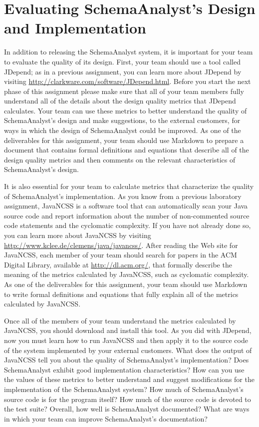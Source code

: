 \section*{Evaluating SchemaAnalyst's Design and Implementation}

In addition to releasing the SchemaAnalyst system, it is important for your team to evaluate the quality of its design.
First, your team should use a tool called JDepend; as in a previous assignment, you can learn more about JDepend by
visiting \url{http://clarkware.com/software/JDepend.html}.  Before you start the next phase of this assignment please
make sure that all of your team members fully understand all of the details about the design quality metrics that
JDepend calculates.  Your team can use these metrics to better understand the quality of SchemaAnalyst's design and
make suggestions, to the external customers, for ways in which the design of SchemaAnalyst could be improved. As one of
the deliverables for this assignment, your team should use Markdown to prepare a document that contains formal
definitions and equations that describe all of the design quality metrics and then comments on the relevant
characteristics of SchemaAnalyst's design.

It is also essential for your team to calculate metrics that characterize the quality of SchemaAnalyst's implementation.
As you know from a previous laboratory assignment, JavaNCSS is a software tool that can automatically scan your Java
source code and report information about the number of non-commented source code statements and the cyclomatic
complexity.  If you have not already done so, you can learn more about JavaNCSS by visiting
\url{http://www.kclee.de/clemens/java/javancss/}. After reading the Web site for JavaNCSS, each member of your team
should search for papers in the ACM Digital Library, available at \url{http://dl.acm.org/}, that formally describe the
meaning of the metrics calculated by JavaNCSS, such as cyclomatic complexity. As one of the deliverables for this
assignment, your team should use Markdown to write formal definitions and equations that fully explain all of the
metrics calculated by JavaNCSS.

Once all of the members of your team understand the metrics calculated by JavaNCSS, you should download and install this
tool.  As you did with JDepend, now you must learn how to run JavaNCSS and then apply it to the source code of the
system implemented by your external customers.  What does the output of JavaNCSS tell you about the quality of
SchemaAnalyst's implementation? Does SchemaAnalyst exhibit good implementation characteristics? How can you use the
values of these metrics to better understand and suggest modifications for the implementation of the SchemaAnalyst
system? How much of SchemaAnalyst's source code is for the program itself? How much of the source code is devoted to the
test suite?  Overall, how well is SchemaAnalyst documented? What are ways in which your team can improve SchemaAnalyst's
documentation?

